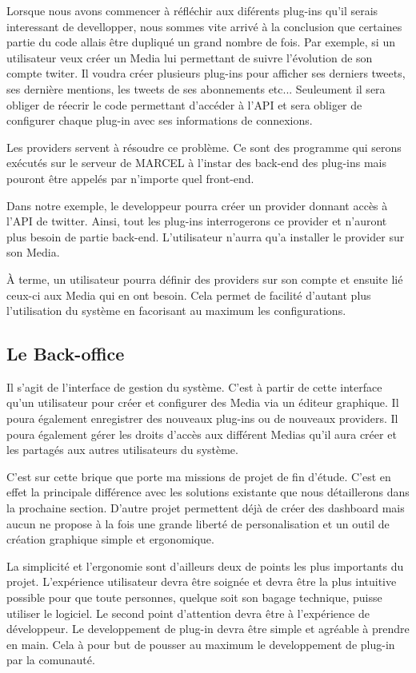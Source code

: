   Lorsque nous avons commencer à réfléchir aux diférents plug-ins qu'il serais interessant de devellopper, nous sommes vite arrivé à la conclusion que certaines partie du code allais être dupliqué un grand nombre de fois. Par exemple, si un utilisateur veux créer un Media lui permettant de suivre l'évolution de son compte twiter. Il voudra créer plusieurs plug-ins pour afficher ses derniers tweets, ses dernière mentions, les tweets de ses abonnements etc... Seuleument il sera obliger de réecrir le code permettant d'accéder à l'\gls{API} et sera obliger de configurer chaque plug-in avec ses informations de connexions.

  Les providers servent à résoudre ce problème. Ce sont des programme qui serons exécutés sur le serveur de MARCEL à l'instar des back-end des plug-ins mais pouront être appelés par n'importe quel front-end.

  Dans notre exemple, le developpeur pourra créer un provider donnant accès à l'\gls{API} de twitter. Ainsi, tout les plug-ins interrogerons ce provider et n'auront plus besoin de partie back-end. L'utilisateur n'aurra qu'a installer le provider sur son Media.

  À terme, un utilisateur pourra définir des providers sur son compte et ensuite lié ceux-ci aux Media qui en ont besoin. Cela permet de facilité d'autant plus l'utilisation du système en facorisant au maximum les configurations.

\subsection{Le Back-office}

  Il s'agit de l'interface de gestion du système. C'est à partir de cette interface qu'un utilisateur pour créer et configurer des Media via un éditeur graphique. Il poura également enregistrer des nouveaux plug-ins ou de nouveaux providers. Il poura également gérer les droits d'accès aux différent Medias qu'il aura créer et les partagés aux autres utilisateurs du système.

  C'est sur cette brique que porte ma missions de projet de fin d'étude. C'est en effet la principale différence avec les solutions existante que nous détaillerons dans la prochaine section. D'autre projet permettent déjà de créer des dashboard mais aucun ne propose à la fois une grande liberté de personalisation et un outil de création graphique simple et ergonomique.

  La simplicité et l'ergonomie sont d'ailleurs deux de points les plus importants du projet. L'expérience utilisateur devra être soignée et devra être la plus intuitive possible pour que toute personnes, quelque soit son bagage technique, puisse utiliser le logiciel. Le second point d'attention devra être à l'expérience de développeur. Le developpement de plug-in devra être simple et agréable à prendre en main. Cela à pour but de pousser au maximum le developpement de plug-in par la comunauté.

